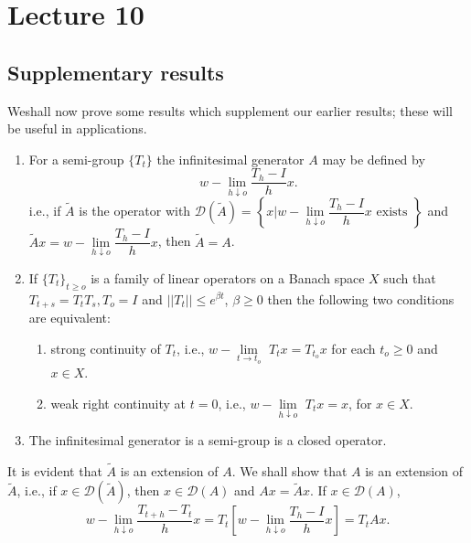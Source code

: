 \chapter{Lecture 10}\label{chap10} %

\section{Supplementary results}\label{chap10:sec1}

We\pageoriginale shall now prove some results which supplement our earlier results;
these will be useful in applications. 
\begin{theorem*}%
 \begin{enumerate}[\rm 1.]
 \item For a semi-group $\{T_t\}$ the infinitesimal generator $A$ may
  be defined by 
  $$
  w-\lim_{h \downarrow o} \frac{T_h-I}{h}x.
  $$ 
  i.e., if $\tilde{A}$ is the operator with $\mathscr{D}(\tilde{A})=
  \left\{x | w-\lim\limits_{h \downarrow o}\dfrac{T_h-I}{h}x
  \text{ exists } \right\}$ and $\tilde{A}x= w-\lim\limits_{h
   \downarrow o} \dfrac{T_h-I}{h}x$, then $\tilde{A}=A$. 
 \item If $\{ T_t\}_{t \ge o}$ is a family of linear operators on a
  Banach space $X$ such that $T_{t+s}= T_t T_s, T_o=I$ and $|| T_t
  || \le e^{\beta t}$, $\beta \ge 0$ then the following two
  conditions are equivalent: 
  \begin{enumerate}[\rm (i)]
  \item strong continuity of $T_t$, i.e., $w-\lim\limits_{t \to t_o}$ $T_t x=
   T_{t_o}x$ for each $t_o \ge 0$ and $x \in X$. 
  \item weak right continuity at $t=0$, i.e., $w-\lim\limits_{h \downarrow
   o}$ $T_t x=x$, for $x \in X$. 
  \end{enumerate}
 \item The infinitesimal generator is a semi-group is a closed operator.
 \end{enumerate}
\end{theorem*}

\begin{Proof}
 It is evident that $\tilde{A}$ is an extension of $A$. We shall show
 that $A$ is an extension of $\tilde{A}$, i.e., if $x \in
 \mathscr{D}(\tilde{A})$, then $x \in \mathscr{D}(A)$ and $Ax=
 \tilde{A}x$. If $x \in \mathscr{D}(A)$, 
 $$ 
 w-\lim_{h \downarrow o} \frac{ T_{t+h}- T_t}{h} x= T_t \left[w-\lim_{h
   \downarrow o} \frac{T_h -I}{h}x\right] = T_t A x. 
 $$
\end{Proof}

